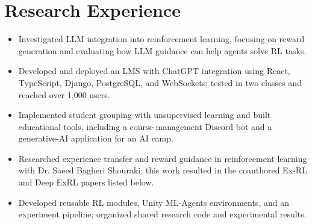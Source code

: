 \section{Research Experience}
\begin{itemize}
  \item Investigated LLM integration into reinforcement learning, focusing on reward generation and evaluating how LLM guidance can help agents solve RL tasks.
  \item Developed and deployed an LMS with ChatGPT integration using React, TypeScript, Django, PostgreSQL, and WebSockets; tested in two classes and reached over 1,000 users.
  \item Implemented student grouping with unsupervised learning and built educational tools, including a course-management Discord bot and a generative-AI application for an AI camp.
\end{itemize}
\begin{itemize}
  \item Researched experience transfer and reward guidance in reinforcement learning with Dr. Saeed Bagheri Shouraki; this work resulted in the coauthored Ex-RL and Deep ExRL papers listed below.
  \item Developed reusable RL modules, Unity ML-Agents environments, and an experiment pipeline; organized shared research code and experimental results.
\end{itemize}
